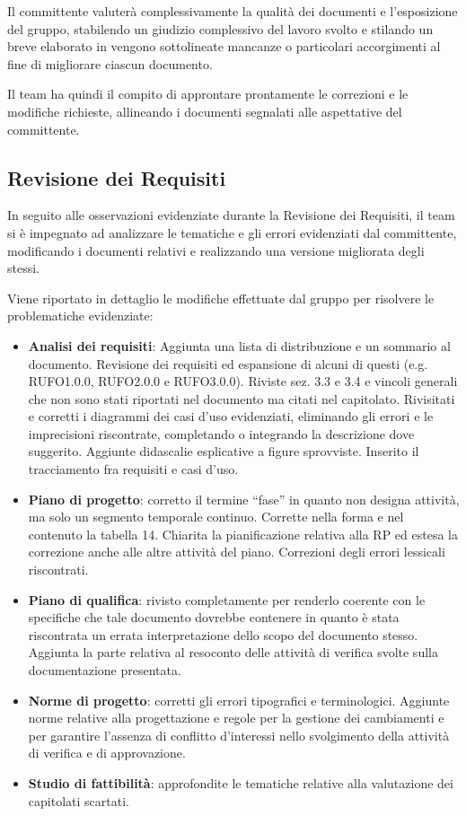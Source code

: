 Il committente valuterà complessivamente la qualità dei documenti e l'esposizione del gruppo, stabilendo un giudizio complessivo del lavoro svolto e stilando un breve elaborato in vengono sottolineate mancanze o particolari accorgimenti al fine di migliorare ciascun documento.

Il team ha quindi il compito di approntare prontamente le correzioni e le modifiche richieste, allineando i documenti segnalati alle aspettative del committente.

\subsection{Revisione dei Requisiti}
In seguito alle osservazioni evidenziate durante la Revisione dei Requisiti, il team si è impegnato ad analizzare le tematiche e gli errori evidenziati dal committente, modificando i documenti relativi e realizzando una versione migliorata degli stessi.

Viene riportato in dettaglio le modifiche effettuate dal gruppo per risolvere le problematiche evidenziate:

\begin{itemize}
\item \textbf{Analisi dei requisiti}: Aggiunta una lista di distribuzione e un sommario al documento. Revisione dei requisiti ed espansione di alcuni di questi (e.g. RUFO1.0.0, RUFO2.0.0 e RUFO3.0.0). Riviste sez. 3.3 e 3.4 e vincoli generali che non sono stati riportati nel documento ma citati nel capitolato. Rivisitati e corretti i diagrammi dei casi d'uso evidenziati, eliminando gli errori e le imprecisioni riscontrate, completando o integrando la descrizione dove suggerito. Aggiunte didascalie esplicative a figure sprovviste. Inserito il tracciamento fra requisiti e casi d'uso.

\item \textbf{Piano di progetto}: corretto il termine ``fase'' in quanto non designa attività, ma solo un segmento temporale continuo. Corrette nella forma e nel contenuto la tabella 14. Chiarita la pianificazione relativa alla \underline{} RP ed estesa la correzione anche alle altre attività del piano. Correzioni degli errori lessicali riscontrati.

\item \textbf{Piano di qualifica}: rivisto completamente per renderlo coerente con le specifiche che tale documento dovrebbe contenere in quanto è stata riscontrata un errata interpretazione dello scopo del documento stesso.
Aggiunta la parte relativa al resoconto delle attività di verifica svolte sulla documentazione presentata.

\item \textbf{Norme di progetto}: corretti gli errori tipografici e terminologici. Aggiunte norme relative alla progettazione e regole per la gestione dei cambiamenti e per garantire l'assenza di conflitto d'interessi nello svolgimento della attività di verifica e di approvazione.

\item \textbf{Studio di fattibilità}: approfondite le tematiche relative alla valutazione dei capitolati scartati.
\end{itemize}

